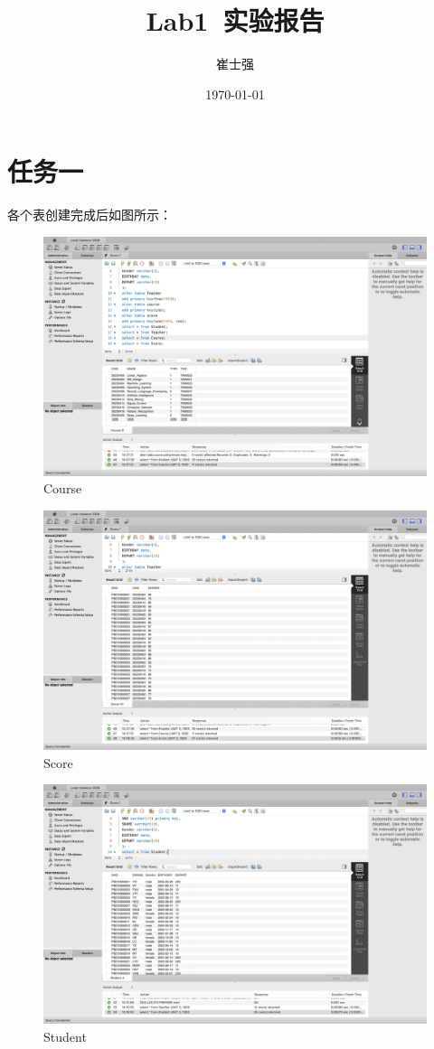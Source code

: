 \documentclass[UTF8]{ctexart}
\title{Lab1\ 实验报告}
\author{崔士强}
\date{\today}
\begin{document}
\maketitle
\section{任务一}
各个表创建完成后如图所示：
\begin{figure}[H]
  \centering
  \includegraphics[scale=0.1]{pics/Course.png}
  \caption*{Course}
\end{figure}
\begin{figure}[H]
  \centering
  \includegraphics[scale=0.1]{pics/Score.png}
  \caption*{Score}
\end{figure}
\begin{figure}[H]
  \centering
  \includegraphics[scale=0.1]{pics/Student.png}
  \caption*{Student}
\end{figure}
\end{document}
